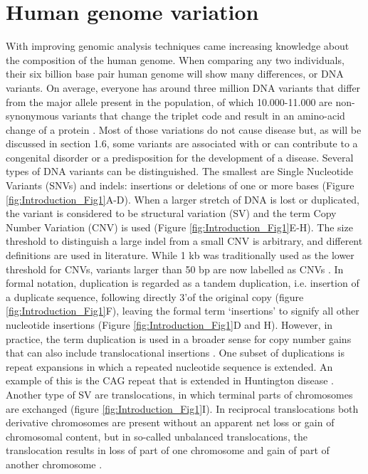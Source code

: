 \section{Human genome variation} \label{intro_variation}
With improving genomic analysis techniques came increasing knowledge about the composition of the human genome. 
When comparing any two individuals, their six billion base pair human genome will show many differences, or DNA variants. On average, everyone has around three million DNA variants that differ from the major allele present in the population, of which 10.000-11.000 are non-synonymous variants that change the triplet code and result in an amino-acid change of a protein \cite{Abecasis_2010}. 
Most of those variations do not cause disease but, as will be discussed in section 1.6, some variants are associated with or can contribute to a congenital disorder or a predisposition for the development of a disease. 
Several types of DNA variants can be distinguished. The smallest are Single Nucleotide Variants (SNVs) and indels: insertions or deletions of one or more bases (Figure \ref{fig:Introduction_Fig1}A-D). 
When a larger stretch of DNA is lost or duplicated, the variant is considered to be structural variation (SV) and the term Copy Number Variation (CNV) is used (Figure \ref{fig:Introduction_Fig1}E-H). 
The size threshold to distinguish a large indel from a small CNV is arbitrary, and different definitions are used in literature. While 1 kb was traditionally used as the lower threshold for CNVs, variants larger than 50 bp are now labelled as CNVs \cite{Redon_2006,Tan_2014,Wilfert_2017}. 
In formal notation, duplication is regarded as a tandem duplication, i.e. insertion of a duplicate sequence, following directly 3’of the original copy (figure \ref{fig:Introduction_Fig1}F), leaving the formal term ‘insertions’ to signify all other nucleotide insertions \cite{den_Dunnen_2016} (Figure \ref{fig:Introduction_Fig1}D and H). 
However, in practice, the term duplication is used in a broader sense for copy number gains that can also include translocational insertions \cite{Kang_2010,Hanemaaijer_2012}. 
One subset of duplications is repeat expansions in which a repeated nucleotide sequence is extended. 
An example of this is the CAG repeat that is extended in Huntington disease \cite{Rubinsztein_1996}. 
Another type of SV are translocations, in which terminal parts of chromosomes are exchanged (figure \ref{fig:Introduction_Fig1}I). 
In reciprocal translocations both derivative chromosomes are present without an apparent net loss or gain of chromosomal content, but in so-called unbalanced translocations, the translocation results in loss of part of one chromosome and gain of part of another chromosome \cite{Maithripala_2017}. 
